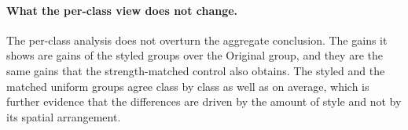 \paragraph{What the per-class view does not change.}
The per-class analysis does not overturn the aggregate conclusion. The
gains it shows are gains of the styled groups over the Original group, and
they are the same gains that the strength-matched control also obtains. The
styled and the matched uniform groups agree class by class as well as on
average, which is further evidence that the differences are driven by the
amount of style and not by its spatial arrangement.
